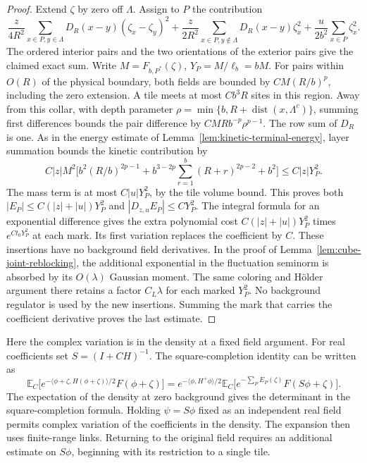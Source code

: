 \documentclass[11pt]{article}
\theoremstyle{definition}
\newcommand{\dist}{\operatorname{dist}}
\newcommand{\E}{\mathbb E}
\begin{document}
\begin{proof}
Extend \(\zeta\) by zero off \(\Lambda\). Assign to \(P\) the
contribution
\begin{equation}
 \frac{z}{4R^2}\sum_{x\in P,y\in\Lambda}
       D_R(x-y)(\zeta_x-\zeta_y)^2+
 \frac{z}{2R^2}\sum_{x\in P,y\notin\Lambda}
       D_R(x-y)\zeta_x^2+
 \frac{u}{2b^2}\sum_{x\in P}\zeta_x^2 .
\end{equation}
The ordered interior pairs and the two orientations of
the exterior pairs give the claimed exact sum. Write
\(M=F_{b,P^*}(\zeta)\), \(Y_P=M/\ell_b=bM\).
For pairs within \(O(R)\) of the physical boundary, both
fields are bounded by \(C M(R/b)^p\), including the zero
extension. A tile meets at most \(C b^3R\) sites in this
region. Away from this collar, with depth parameter
\(\rho=\min\{b,R+\dist(x,\Lambda^c)\}\), summing first
differences bounds the pair difference by
\(C M R b^{-p}\rho^{p-1}\).
The row sum of \(D_R\) is one. As in the energy estimate
of Lemma~\ref{lem:kinetic-terminal-energy}, layer summation
bounds the kinetic contribution by
\begin{equation}
 C|z|M^2\bigl[b^2(R/b)^{2p-1}
                 + b^{3-2p}\textstyle\sum_{r=1}^b(R+r)^{2p-2}
                 + b^2\bigr]\le C|z|Y_P^2 .
\end{equation}
The mass term is at most \(C|u|Y_P^2\), by the tile volume
bound. This proves both \(|E_P|\le C (|z|+|u|)Y_P^2\) and
\(|D_{z,u}E_P|\le C Y_P^2\). The integral formula for an
exponential difference gives the extra polynomial cost
\(C (|z|+|u|)Y_P^2\) times \(e^{C t_0 Y_P^2}\) at each mark.
Its first variation replaces the coefficient by \(C\).
These insertions have no background field derivatives.
In the proof of Lemma~\ref{lem:cube-joint-reblocking}, the
additional exponential in the fluctuation seminorm is absorbed
by its \(O(\lambda)\) Gaussian moment. The same coloring and
Hölder argument there retains a factor \(C_L\lambda\) for
each marked \(Y_P^2\). No background regulator is used by
the new insertions. Summing the mark that carries the coefficient
derivative proves the last estimate.
\end{proof}

Here the complex variation is in the density at a fixed field
argument. For real coefficients set \(S=(I+CH)^{-1}\).
The square-completion identity can be written as
\begin{equation}
 \E_C\big[e^{-\langle\phi+\zeta,H(\phi+\zeta)\rangle/2}
                     F(\phi+\zeta)\big]
 = e^{-\langle\phi,H^+\phi\rangle/2}
       \E_C\big[e^{-\sum_P E_P(\zeta)}F(S\phi+\zeta)\big].
\end{equation}
The expectation of the density at zero background gives the
determinant in the square-completion formula. Holding
\(\psi=S\phi\) fixed as an independent real field permits complex
variation of the coefficients in the density. The expansion then
uses finite-range links. Returning to the original field requires
an additional estimate on \(S\phi\), beginning with its restriction
to a single tile.
\end{document}
